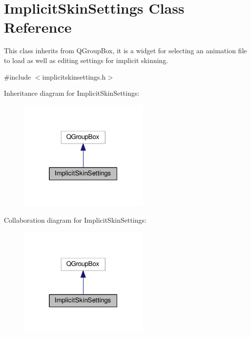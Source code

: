 \hypertarget{classImplicitSkinSettings}{}\section{Implicit\+Skin\+Settings Class Reference}
\label{classImplicitSkinSettings}


This class inherits from Q\+Group\+Box, it is a widget for selecting an animation file to load as well as editing settings for implicit skinning.  




{\ttfamily \#include $<$implicitskinsettings.\+h$>$}



Inheritance diagram for Implicit\+Skin\+Settings\+:
\nopagebreak
\begin{figure}[H]
\begin{center}
\leavevmode
\includegraphics[width=184pt]{d0/ddd/classImplicitSkinSettings__inherit__graph}
\end{center}
\end{figure}


Collaboration diagram for Implicit\+Skin\+Settings\+:
\nopagebreak
\begin{figure}[H]
\begin{center}
\leavevmode
\includegraphics[width=184pt]{d2/d88/classImplicitSkinSettings__coll__graph}
\end{center}
\end{figure}
